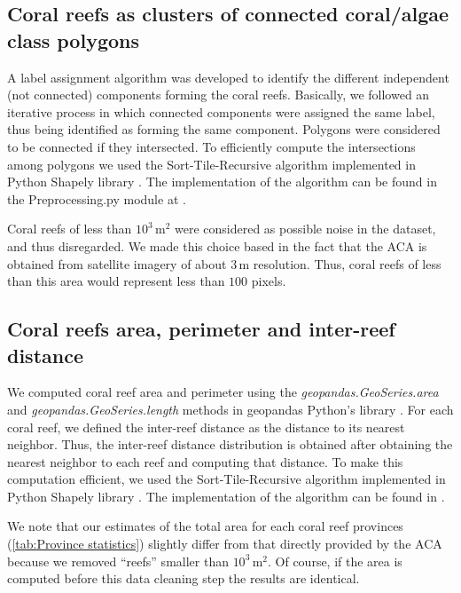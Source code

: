 \subsection{Coral reefs as clusters of connected coral/algae class polygons}

A label assignment algorithm was developed to identify the different
independent (not connected) components forming the coral reefs. Basically, we
followed an iterative process in which connected components were assigned the
same label, thus being identified as forming the same component. Polygons were
considered to be connected if they intersected. To efficiently compute the
intersections among polygons we used the Sort-Tile-Recursive algorithm
\cite{STRtree} implemented in Python Shapely library \cite{shapely}. The
implementation of the algorithm can be found in the Preprocessing.py module at
\cite{CODE_corals}.

Coral reefs of less than $10^3\,\textrm{m}^2$ were considered as possible
noise in the dataset, and thus disregarded. We made this choice based in the
fact that the ACA is obtained from satellite imagery of about $3\,\textrm{m}$
resolution. Thus, coral reefs of less than this area would represent less than
$100$ pixels.

\subsection{Coral reefs area, perimeter and inter-reef distance}

We computed coral reef area and perimeter using the
\textit{geopandas.GeoSeries.area} and \textit{geopandas.GeoSeries.length}
methods in geopandas Python's library \cite{Geopandas}. For each coral reef, we
defined the inter-reef distance as the distance to its nearest neighbor. Thus,
the inter-reef distance distribution is obtained after obtaining the nearest
neighbor to each reef and computing that distance. To make this computation
efficient, we used the Sort-Tile-Recursive algorithm \cite{STRtree} implemented
in Python Shapely library \cite{shapely}. The implementation of the algorithm
can be found in \cite{CODE_corals}.

We note that our estimates of the total area for each coral reef provinces
(\cref{tab:Province statistics}) slightly differ from that directly provided
by the ACA because we removed ``reefs'' smaller than $10^3\, \textrm{m}^2$. Of
course, if the area is computed before this data cleaning step the results are
identical.

